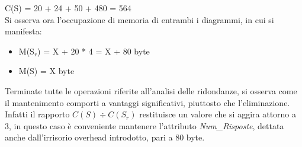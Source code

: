\documentclass{article}
\begin{document}
\hspace*{15pt}C(S) = 20 + 24 + 50 + 480 = 564 \vspace*{7pt} \vspace*{7pt}\\
Si osserva ora l'occupazione di memoria di entrambi i diagrammi, in cui si manifesta:
\begin{itemize}[label={-}]
    \itemsep0em
    \item M(S$_r$) = X + 20 * 4 = X + 80 byte
    \item M(S) = \hspace*{1pt}X byte
\end{itemize}
Terminate tutte le operazioni riferite all'analisi delle ridondanze, si osserva come il mantenimento comporti a vantaggi significativi, piuttosto che l'eliminazione. Infatti il rapporto $C(S) \div C(S_r)$ restituisce un valore che si aggira attorno a 3, in questo caso è conveniente mantenere l'attributo \textit{Num\_Risposte}, dettata anche dall'irrisorio overhead introdotto, pari a 80 byte.
\end{document}
